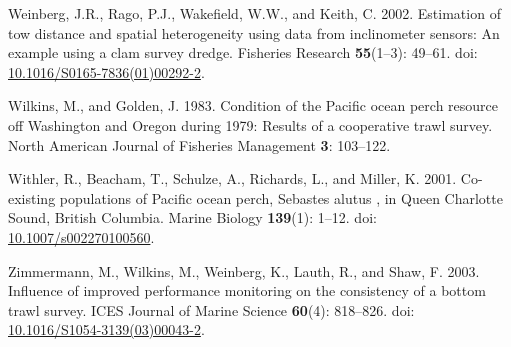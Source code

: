 \documentclass[12pt,]{article}
\begin{document}
\hypertarget{ref-weinberg_estimation_2002}{}
Weinberg, J.R., Rago, P.J., Wakefield, W.W., and Keith, C. 2002.
Estimation of tow distance and spatial heterogeneity using data from
inclinometer sensors: An example using a clam survey dredge. Fisheries
Research \textbf{55}(1--3): 49--61. doi:
\href{https://doi.org/10.1016/S0165-7836(01)00292-2}{10.1016/S0165-7836(01)00292-2}.

\hypertarget{ref-wilkins_condition_1983}{}
Wilkins, M., and Golden, J. 1983. Condition of the Pacific ocean perch
resource off Washington and Oregon during 1979: Results of a cooperative
trawl survey. North American Journal of Fisheries Management \textbf{3}:
103--122.

\hypertarget{ref-withler_co-existing_2001}{}
Withler, R., Beacham, T., Schulze, A., Richards, L., and Miller, K.
2001. Co-existing populations of Pacific ocean perch, Sebastes alutus ,
in Queen Charlotte Sound, British Columbia. Marine Biology
\textbf{139}(1): 1--12. doi:
\href{https://doi.org/10.1007/s002270100560}{10.1007/s002270100560}.

\hypertarget{ref-zimmermann_influence_2003}{}
Zimmermann, M., Wilkins, M., Weinberg, K., Lauth, R., and Shaw, F. 2003.
Influence of improved performance monitoring on the consistency of a
bottom trawl survey. ICES Journal of Marine Science \textbf{60}(4):
818--826. doi:
\href{https://doi.org/10.1016/S1054-3139(03)00043-2}{10.1016/S1054-3139(03)00043-2}.
\end{document}
